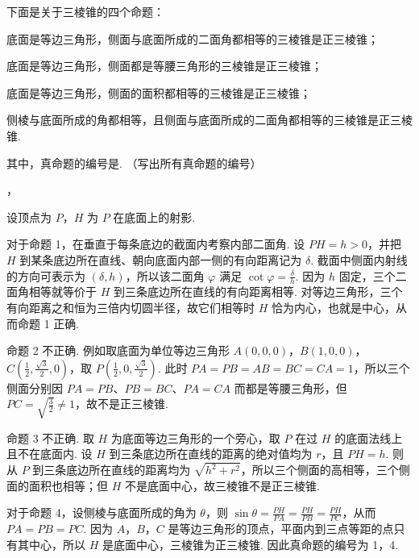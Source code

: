 \begin{problem}
下面是关于三棱锥的四个命题：

\begin{circlelist}
\item 底面是等边三角形，侧面与底面所成的二面角都相等的三棱锥是正三棱锥；
\item 底面是等边三角形，侧面都是等腰三角形的三棱锥是正三棱锥；
\item 底面是等边三角形，侧面的面积都相等的三棱锥是正三棱锥；
\item 侧棱与底面所成的角都相等，且侧面与底面所成的二面角都相等的三棱锥是正三棱锥.
\end{circlelist}

其中，真命题的编号是\fillinblank{}. （写出所有真命题的编号）
\end{problem}

\begin{answer}
，
\end{answer}

\begin{solution}
设顶点为 \(P\)，\(H\) 为 \(P\) 在底面上的射影.

对于命题 1，在垂直于每条底边的截面内考察内部二面角. 设 \(PH=h>0\)，并把 \(H\) 到某条底边所在直线、朝向底面内部一侧的有向距离记为 \(\delta\). 截面中侧面内射线的方向可表示为 \((\delta,h)\)，所以该二面角 \(\varphi\) 满足 \(\cot\varphi=\frac{\delta}{h}\). 因为 \(h\) 固定，三个二面角相等就等价于 \(H\) 到三条底边所在直线的有向距离相等. 对等边三角形，三个有向距离之和恒为三倍内切圆半径，故它们相等时 \(H\) 恰为内心，也就是中心，从而命题 1 正确.

命题 2 不正确. 例如取底面为单位等边三角形 \(A(0,0,0)\)，\(B(1,0,0)\)，\(C\left(\frac12,\frac{\sqrt3}{2},0\right)\)，取 \(P\left(\frac12,0,\frac{\sqrt3}{2}\right)\). 此时 \(PA=PB=AB=BC=CA=1\)，所以三个侧面分别因 \(PA=PB\)、\(PB=BC\)、\(PA=CA\) 而都是等腰三角形，但 \(PC=\sqrt{\frac32}\neq1\)，故不是正三棱锥.

命题 3 不正确. 取 \(H\) 为底面等边三角形的一个旁心，取 \(P\) 在过 \(H\) 的底面法线上且不在底面内. 设 \(H\) 到三条底边所在直线的距离的绝对值均为 \(r\)，且 \(PH=h\). 则从 \(P\) 到三条底边所在直线的距离均为 \(\sqrt{h^2+r^2}\)，所以三个侧面的高相等，三个侧面的面积也相等；但 \(H\) 不是底面中心，故三棱锥不是正三棱锥.

对于命题 4，设侧棱与底面所成的角为 \(\theta\)，则 \(\sin\theta=\frac{PH}{PA}=\frac{PH}{PB}=\frac{PH}{PC}\)，从而 \(PA=PB=PC\). 因为 \(A\)，\(B\)，\(C\) 是等边三角形的顶点，平面内到三点等距的点只有其中心，所以 \(H\) 是底面中心，三棱锥为正三棱锥. 因此真命题的编号为 1，4.
\end{solution}

